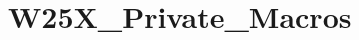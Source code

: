 \hypertarget{group___w25_x___private___macros}{}\section{W25\+X\+\_\+\+Private\+\_\+\+Macros}
\label{group___w25_x___private___macros}
